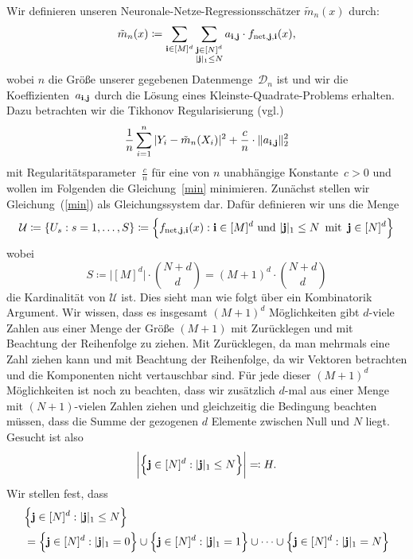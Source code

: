 Wir definieren unseren Neuronale-Netze-Regressionsschätzer $\tilde{m}_n(x)$  durch:
\begin{equation}
\label{estimate}
\tilde{m}_n(x) \coloneqq \sum_{\mathbf{i} \in [M]^d} \sum_{\substack{\mathbf{j} \in [N]^d\\|\mathbf{j}|_1 \leq N}} a_{\mathbf{i},\mathbf{j}} \cdot f_{\mathrm{net},\mathbf{j},\mathbf{i}}(x),
\end{equation}
wobei $n$ die Größe unserer gegebenen Datenmenge~$\mathcal{D}_n$ ist und wir die Koeffizienten~$a_{\mathbf{i},\mathbf{j}}$ durch die Lösung eines Kleinste-Quadrate-Problems erhalten. Dazu betrachten wir die Tikhonov Regularisierung (vgl.\@ \cite[Kapitel 16.1]{Kress1998})
\begin{equation}
\label{min} 
\begin{split}
\frac{1}{n} \sum_{i = 1}^n|Y_i - \tilde{m}_n(X_i)|^2 + \frac{c}{n} \cdot \|a_{\mathbf{i},\mathbf{j}}\|_2^2
\end{split}
\end{equation}
mit Regularitätsparameter~$\frac{c}{n}$ für eine von $n$ unabhängige Konstante~$c > 0$ und wollen im Folgenden die Gleichung~\eqref{min} minimieren. Zunächst stellen wir Gleichung~(\ref{min}) als Gleichungssystem dar. Dafür definieren wir uns die Menge 
\begin{align*} 
\mathcal{U} \coloneqq \{U_s : s = 1,\dots,S\} \coloneqq \Bigl\{f_{\mathrm{net},\mathbf{j},\mathbf{i}}(x) : \mathbf{i} \in [M]^d \text{ und } |\mathbf{j}|_1 \leq N \, \text{ mit }\, \mathbf{j} \in [N]^d \Bigr\}
\end{align*}
wobei
$$ S \coloneqq \big|[M]^d\big| \cdot  \binom{N + d}{d} = (M + 1)^d \cdot \binom{N + d}{d}$$ die Kardinalität von $\mathcal{U}$ ist.
Dies sieht man wie folgt über ein Kombinatorik Argument.
Wir wissen, dass es insgesamt $(M + 1)^d$ Möglichkeiten gibt $d$-viele Zahlen aus einer Menge der Größe $(M + 1)$ mit Zurücklegen und mit Beachtung der Reihenfolge zu ziehen. Mit Zurücklegen, da man mehrmals eine Zahl ziehen kann und mit Beachtung der Reihenfolge, da wir Vektoren betrachten und die Komponenten nicht vertauschbar sind.
Für jede dieser $(M + 1)^d$ Möglichkeiten ist noch zu beachten, dass wir zusätzlich $d$-mal aus einer Menge mit $(N + 1)$-vielen Zahlen ziehen und gleichzeitig die Bedingung beachten müssen, dass die Summe der gezogenen $d$ Elemente zwischen Null und $N$ liegt.
Gesucht ist also 
$$\bigg|\Bigl\{\mathbf{j} \in [N]^d : |\mathbf{j}|_1 \leq N \Bigr\}\bigg| \eqqcolon H.$$ 
Wir stellen fest, dass
\begin{equation*}
\begin{split}
& \Bigl\{\mathbf{j} \in [N]^d : |\mathbf{j}|_1 \leq N \Bigr\} \\
& = \Bigl\{\mathbf{j} \in [N]^d : |\mathbf{j}|_1 = 0 \Bigr\}
 \cup \Bigl\{\mathbf{j} \in [N]^d : |\mathbf{j}|_1 = 1 \Bigr\}
 \cup \dots 
 \cup \Bigl\{\mathbf{j} \in [N]^d : |\mathbf{j}|_1 = N\Bigr\}
\end{split}
\end{equation*}
